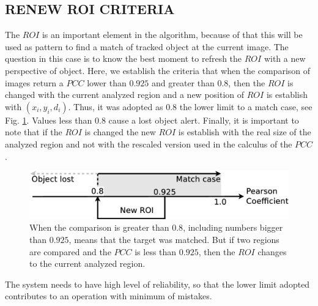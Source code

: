 \subsection{RENEW ROI CRITERIA}
The $ROI$ is an important element in the algorithm, because of that this  
will be used as pattern to find a match of tracked object at the current image. 
The  question in this case is to know the best moment to refresh the $ROI$
with a new perspective of object. 
Here, we establish the criteria that when the comparison of images return 
a $PCC$ lower than $0.925$ and greater than $0.8$, then the $ROI$ is changed with the current 
analyzed region and a new position of $ROI$ is establish with $(x_i,y_i,d_i)$. 
Thus, it was adopted as $0.8$ the lower limit to a match case\cite{Eugene},
see Fig. \ref{fig:newroicri}. Values less than $0.8$ cause a  lost object alert.
Finally, it is important to note that if the $ROI$ is changed the new $ROI$ is establish
with the real size of the analyzed region and not with the rescaled version used
in the calculus of the $PCC$.


\begin{figure}[H]
\includegraphics[width=\columnwidth]{images/figure3.eps}
\caption{When the comparison is greater than $0.8$, including numbers bigger than 
$0.925$, means that the target was matched. But if two regions are compared 
and the $PCC$ is less than $0.925$, then the $ROI$ changes to the current analyzed region.}
\label{fig:newroicri}
\end{figure}

The system needs to have high level of reliability, so that the lower limit adopted 
contributes to an operation with minimum of mistakes.
